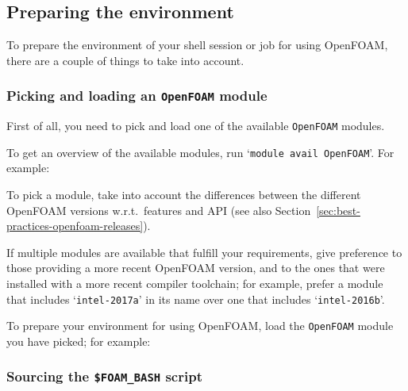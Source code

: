 \subsection{Preparing the environment}
\label{sec:best-practices-openfoam-environment}

To prepare the environment of your shell session or job for using OpenFOAM,
there are a couple of things to take into account.


\subsubsection{Picking and loading an {\small\texttt{OpenFOAM}} module}

First of all, you need to pick and load one of the available {\small\texttt{OpenFOAM}} modules.

To get an overview of the available modules, run `{\small\texttt{module avail OpenFOAM}}'. For example:

\begin{prompt}
\end{prompt}

To pick a module, take into account the differences between the different OpenFOAM versions w.r.t.\ features and
API (see also Section~\ref{sec:best-practices-openfoam-releases}).

If multiple modules are available that fulfill your requirements, give preference to those providing a more recent
OpenFOAM version, and to the ones that were installed with a more recent compiler toolchain; for example, prefer
a module that includes `{\small\texttt{intel-2017a}}' in its name over one that includes
`{\small\texttt{intel-2016b}}'.

To prepare your environment for using OpenFOAM, load the {\small\texttt{OpenFOAM}} module you have picked; for example:

\begin{prompt}
\end{prompt}

\subsubsection{Sourcing the {\small\texttt{\$FOAM\_BASH}} script}

